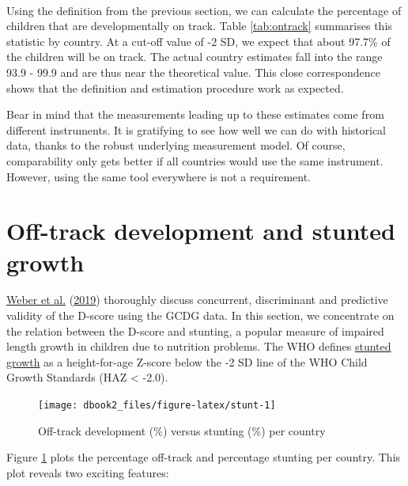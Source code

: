 \documentclass[
]{book}
\begin{document}
~

Using the definition from the previous section, we can calculate the percentage of children that are developmentally on track. Table \ref{tab:ontrack} summarises this statistic by country. At a cut-off value of -2 SD, we expect that about 97.7\% of the children will be on track. The actual country estimates fall into the range 93.9 - 99.9 and are thus near the theoretical value. This close correspondence shows that the definition and estimation procedure work as expected.

Bear in mind that the measurements leading up to these estimates come from different instruments. It is gratifying to see how well we can do with historical data, thanks to the robust underlying measurement model. Of course, comparability only gets better if all countries would use the same instrument. However, using the same tool everywhere is not a requirement.

\hypertarget{sec:otherestimates}{%
\section{Off-track development and stunted growth}\label{sec:otherestimates}}

\protect\hyperlink{ref-Weber2019}{Weber et al.} (\protect\hyperlink{ref-Weber2019}{2019}) thoroughly discuss concurrent, discriminant and predictive validity of the D-score using the GCDG data. In this section, we concentrate on the relation between the D-score and stunting, a popular measure of impaired length growth in children due to nutrition problems. The WHO defines \href{https://www.who.int/nutrition/healthygrowthproj/en/index1.html}{stunted growth} as a height-for-age Z-score below the -2 SD line of the WHO Child Growth Standards (HAZ \textless{} -2.0).

\begin{figure}

{\centering \texttt{[image: dbook2\_files/figure-latex/stunt-1]} 

}

\caption{Off-track development (\%) versus stunting (\%) per country}\label{fig:stunt}
\end{figure}



Figure \ref{fig:stunt} plots the percentage off-track and percentage stunting per country. This plot reveals two exciting features:
\end{document}
